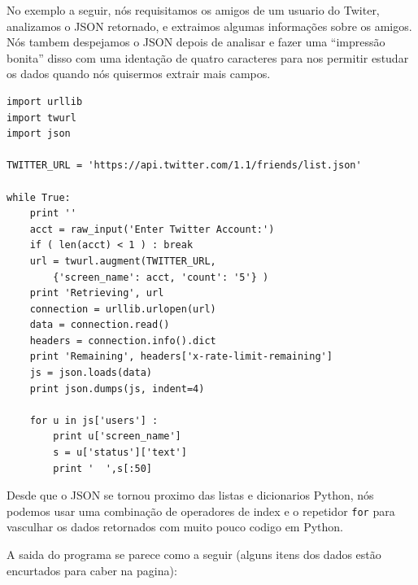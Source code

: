No exemplo a seguir, nós requisitamos os amigos de um usuario do
Twiter, analizamos o JSON retornado, e extraimos algumas informações
sobre os amigos. Nós tambem despejamos o JSON depois de analisar e
fazer uma ``impressão bonita'' disso com uma identação de quatro
caracteres para nos permitir estudar os dados quando nós quisermos
extrair mais campos.

\beforeverb
\begin{verbatim}
import urllib
import twurl
import json

TWITTER_URL = 'https://api.twitter.com/1.1/friends/list.json'

while True:
    print ''
    acct = raw_input('Enter Twitter Account:')
    if ( len(acct) < 1 ) : break
    url = twurl.augment(TWITTER_URL,
        {'screen_name': acct, 'count': '5'} )
    print 'Retrieving', url
    connection = urllib.urlopen(url)
    data = connection.read()
    headers = connection.info().dict
    print 'Remaining', headers['x-rate-limit-remaining']
    js = json.loads(data)
    print json.dumps(js, indent=4)

    for u in js['users'] :
        print u['screen_name']
        s = u['status']['text']
        print '  ',s[:50]
\end{verbatim}
\afterverb
%
Desde que o JSON se tornou proximo das listas e dicionarios Python,
nós podemos usar uma combinação de operadores de index e o repetidor
{\tt for} para vasculhar os dados retornados com muito pouco 
codigo em Python.

A saida do programa se parece como a seguir (alguns itens dos dados
estão encurtados para caber na pagina):

